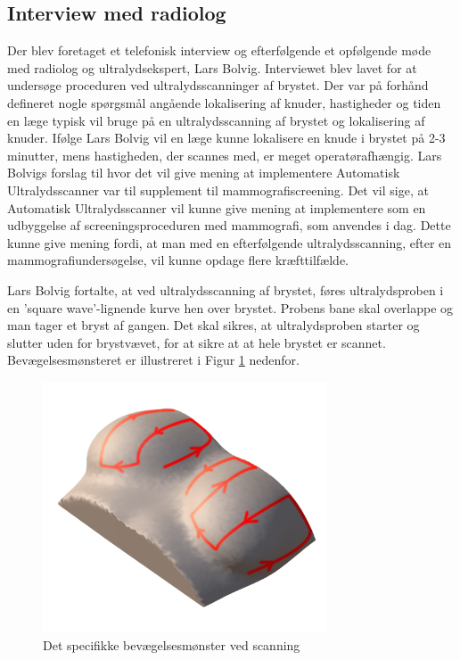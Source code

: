 \subsection{Interview med radiolog}
Der blev foretaget et telefonisk interview og efterfølgende et opfølgende møde med radiolog og ultralydsekspert, Lars Bolvig. Interviewet blev lavet for at undersøge proceduren ved ultralydsscanninger af brystet. Der var på forhånd defineret nogle spørgsmål angående lokalisering af knuder, hastigheder og tiden en læge typisk vil bruge på en ultralydsscanning af brystet og lokalisering af knuder. Ifølge Lars Bolvig vil en læge kunne lokalisere en knude i brystet på 2-3 minutter, mens hastigheden, der scannes med, er meget operatørafhængig. Lars Bolvigs forslag til hvor det vil give mening at implementere Automatisk Ultralydsscanner var til supplement til mammografiscreening. Det vil sige, at Automatisk Ultralydsscanner vil kunne give mening at implementere som en udbyggelse af screeningsproceduren med mammografi, som anvendes i dag. Dette kunne give mening fordi, at man med en efterfølgende ultralydsscanning, efter en mammografiundersøgelse, vil kunne opdage flere kræfttilfælde. 

Lars Bolvig fortalte, at ved ultralydsscanning af brystet, føres ultralydsproben i en 'square wave'-lignende kurve hen over brystet. Probens bane skal overlappe og man tager et bryst af gangen. Det skal sikres, at ultralydsproben starter og slutter uden for brystvævet, for at sikre at at hele brystet er scannet. Bevægelsesmønsteret er illustreret i Figur \ref{Probensbevagelse} nedenfor. 

\begin{figure}[H]
    \centering
    \includegraphics[width=0.75\textwidth]{figurer/d/probebevagelse}
    \caption{Det specifikke bevægelsesmønster ved scanning}
    \label{Probensbevagelse}
\end{figure}

